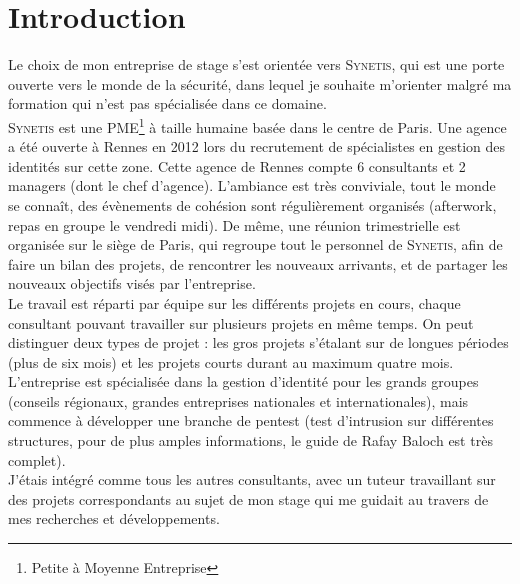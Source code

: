 \section*{Introduction} \label{intro}%

%
%
%
Le choix de mon entreprise de stage s'est orientée vers \textsc{Synetis}, qui est une porte ouverte vers le monde de la sécurité, dans lequel je souhaite m'orienter malgré ma formation qui n'est pas spécialisée dans ce domaine.\\
\textsc{Synetis} est une PME\footnote{Petite à Moyenne Entreprise} à taille humaine basée dans le centre de Paris. Une agence a été ouverte à Rennes en 2012 lors du recrutement de spécialistes en gestion des identités sur cette zone. Cette agence de Rennes compte 6 consultants et 2 managers (dont le chef d'agence). L'ambiance est très conviviale, tout le monde se connaît, des évènements de cohésion sont régulièrement organisés (afterwork, repas en groupe le vendredi midi). De même, une réunion trimestrielle est organisée sur le siège de Paris, qui regroupe tout le personnel de \textsc{Synetis}, afin de faire un bilan des projets, de rencontrer les nouveaux arrivants, et de partager les nouveaux objectifs visés par l'entreprise.\\
Le travail est réparti par équipe sur les différents projets en cours, chaque consultant pouvant travailler sur plusieurs projets en même temps. On peut distinguer deux types de projet : les gros projets s'étalant sur de longues périodes (plus de six mois) et les projets courts durant au maximum quatre mois. L'entreprise est spécialisée dans la gestion d'identité pour les grands groupes (conseils régionaux, grandes entreprises nationales et internationales), mais commence à développer une branche de pentest (test d'intrusion sur différentes structures, pour de plus amples informations, le guide de Rafay Baloch \cite{rba} est très complet).\\
J'étais intégré comme tous les autres consultants, avec un tuteur travaillant sur des projets correspondants au sujet de mon stage qui me guidait au travers de mes recherches et développements.\\
